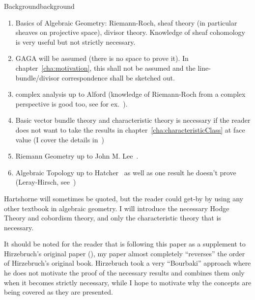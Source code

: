 \documentclass{book}
\begin{document}
\begin{titledBox}{Background}{background}
  \begin{enumerate}
  \item Basics of Algebraic Geometry: Riemann-Roch, sheaf theory (in particular sheaves on projective space),
    divisor theory. Knowledge of sheaf cohomology is very useful but not strictly necessary.
  \item GAGA will be assumed (there is no space to prove it). In chapter~\ref{cha:motivation}, this shall not
    be assumed and the line-bundle/divisor correspondence shall be sketched out.
  \item complex analysis up to Alford (knowledge of Riemann-Roch from a complex perspective is good too,
    see for ex.~\cite{a.griffithsIntroductionAlgebraicCurves}).
  \item Basic vector bundle theory and characteristic theory is necessary if the reader does not want to take the results in
    chapter~\ref{cha:characteristicClass} at face value (I cover the details in~\cite{NateKTheory})
  \item Riemann Geometry up to John M. Lee~\cite{leeIntroductionRiemannianManifolds2018}.
  \item Algebraic Topology up to Hatcher~\cite{hatcherAlgebraicTopology} as well as one result he doesn't prove (Leray-Hirsch,
    see~\cite{NateAlgTop})
\end{enumerate}
\end{titledBox}

Hartshorne will sometimes be quoted, but the reader could get-by by using any other textbook in algebraic
geometry. I will introduce the necessary Hodge Theory and cobordism theory, and only the characteristic theory
that is necessary.

It should be noted for the reader that is following this paper as a supplement to Hirzebruch's original paper
(\cite{hirzebruchTopologicalMethodsAlgebraic1995}), my paper almost completely ``reverses'' the order of
Hirzebruch's original book. Hirzebruch took a very ``Bourbaki'' approach where he does not motivate the proof
of the necessary results and combines them only when it becomes strictly necessary, while I hope to motivate
why the concepts are being covered as they are presented.

\end{document}
